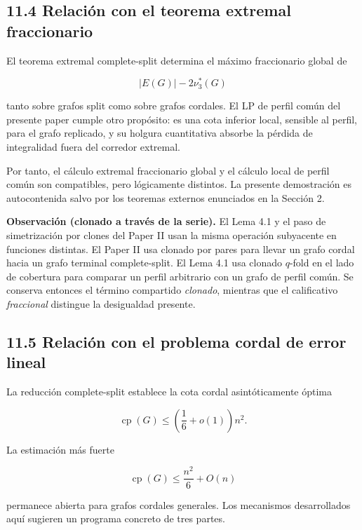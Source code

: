 \documentclass[
  11pt,
]{article}
\begin{document}
\subsection{11.4 Relación con el teorema extremal
fraccionario}\label{relaciuxf3n-con-el-teorema-extremal-fraccionario}

El teorema extremal complete-split determina el máximo fraccionario
global de

\[
|E(G)|-2\nu_3^*(G)
\]

tanto sobre grafos split como sobre grafos cordales. El LP de perfil
común del presente paper cumple otro propósito: es una cota inferior
local, sensible al perfil, para el grafo replicado, y su holgura
cuantitativa absorbe la pérdida de integralidad fuera del corredor
extremal.

Por tanto, el cálculo extremal fraccionario global y el cálculo local de
perfil común son compatibles, pero lógicamente distintos. La presente
demostración es autocontenida salvo por los teoremas externos enunciados
en la Sección 2.

\textbf{Observación (clonado a través de la serie).} El Lema 4.1 y el
paso de simetrización por clones del Paper II usan la misma operación
subyacente en funciones distintas. El Paper II usa clonado por pares
para llevar un grafo cordal hacia un grafo terminal complete-split. El
Lema 4.1 usa clonado \(q\)-fold en el lado de cobertura para comparar un
perfil arbitrario con un grafo de perfil común. Se conserva entonces el
término compartido \emph{clonado}, mientras que el calificativo
\emph{fraccional} distingue la desigualdad presente.

\subsection{11.5 Relación con el problema cordal de error
lineal}\label{relaciuxf3n-con-el-problema-cordal-de-error-lineal}

La reducción complete-split establece la cota cordal asintóticamente
óptima

\[
\operatorname{cp}(G)
\le
\left(\frac16+o(1)\right)n^2.
\]

La estimación más fuerte

\[
\operatorname{cp}(G)
\le
\frac{n^2}{6}+O(n)
\]

permanece abierta para grafos cordales generales. Los mecanismos
desarrollados aquí sugieren un programa concreto de tres partes.
\end{document}
